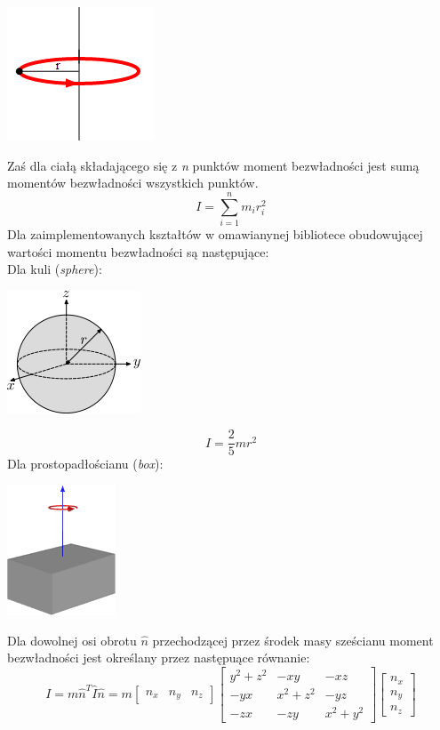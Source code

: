 \begin{center}
\includegraphics{./img/inertia.png}
\end{center}

Zaś dla ciałą składającego się z \emph{n} punktów moment bezwładności jest sumą
momentów bezwładności wszystkich punktów.
\begin{equation}
I = \sum_{i=1}^{n} m_{i}r_{i}^{2}
\end{equation}
Dla zaimplementowanych kształtów w omawianynej bibliotece obudowującej wartości
momentu bezwładności są następujące:\\
Dla kuli (\emph{sphere}):\\
\begin{center}
\includegraphics{./img/inertiaSphere.png}
\end{center}
\begin{equation}
I = \frac{2}{5}mr^{2}
\end{equation}
Dla prostopadłościanu (\emph{box}):\\
\begin{center}
\includegraphics{./img/inertiaBox.png}
\end{center}
Dla dowolnej osi obrotu $ \hat{n} $ przechodzącej przez środek masy sześcianu
moment bezwładności jest określany przez następuące równanie:
\begin{equation}
I = m\hat{n}^{T}\hat{I}\hat{n} = m
\begin{bmatrix}n_{x}&n_{y}&n_{z}\end{bmatrix}
\begin{bmatrix}y^{2}+z^{2}&-xy&-xz\\-yx&x^{2}+z^{2}&-yz\\-zx&-zy&x^{2}+y^{2}\end{bmatrix}
\begin{bmatrix}n_{x}\\n_{y}\\n_{z}\end{bmatrix}
\label{eq:boxInertia}
\end{equation}
